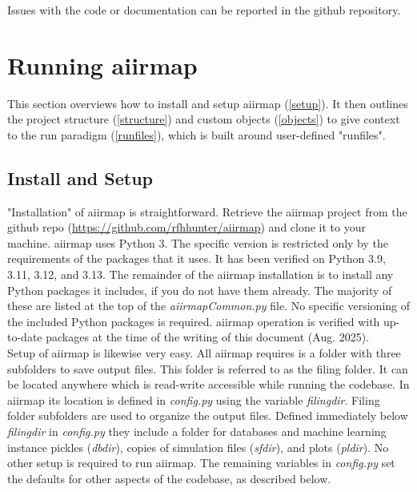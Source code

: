 \documentclass[a4paper,12pt,english]{article}
\begin{document}
    Issues with the code or documentation can be reported in the github repository.\\
    

    \section{Running aiirmap} \label{run}
    This section overviews how to install and setup aiirmap (\autoref{setup}). It then outlines the project structure (\autoref{structure}) and custom objects (\autoref{objects}) to give context to the run paradigm (\autoref{runfiles}), which is built around user-defined "runfiles". \\
    
    \subsection{Install and Setup} \label{setup}
    "Installation" of aiirmap is straightforward. Retrieve the aiirmap project from the github repo (\url{https://github.com/rfhhunter/aiirmap}) and clone it to your machine. aiirmap uses Python 3. The specific version is restricted only by the requirements of the packages that it uses. It has been verified on Python 3.9, 3.11, 3.12, and 3.13. The remainder of the aiirmap installation is to install any Python packages it includes, if you do not have them already. The majority of these are listed at the top of the \textit{aiirmapCommon.py} file. No specific versioning of the included Python packages is required. aiirmap operation is verified with up-to-date packages at the time of the writing of this document (Aug. 2025). \\

    Setup of aiirmap is likewise very easy. All aiirmap requires is a folder with three subfolders to save output files. This folder is referred to as the filing folder. It can be located anywhere which is read-write accessible while running the codebase. In aiirmap its location is defined in \textit{config.py} using the variable \textit{filingdir}. Filing folder subfolders are used to organize the output files. Defined immediately below \textit{filingdir} in \textit{config.py} they include a folder for databases and machine learning instance pickles (\textit{dbdir}), copies of simulation files (\textit{sfdir}), and plots (\textit{pldir}). No other setup is required to run aiirmap. The remaining variables in \textit{config.py} set the defaults for other aspects of the codebase, as described below. \\      
    
\end{document}
